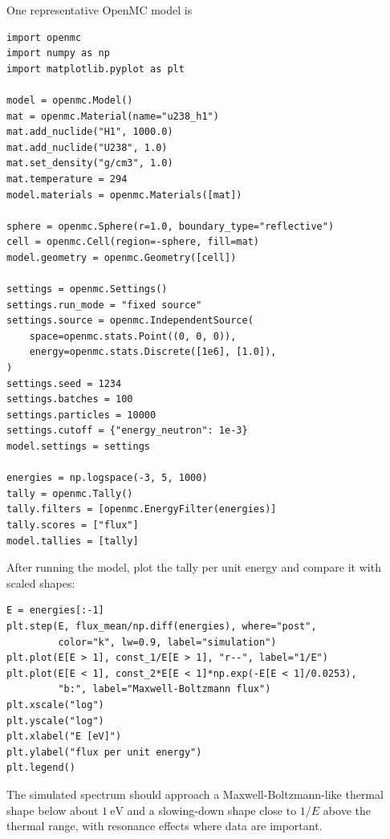 \begin{adaptedsolution}
One representative OpenMC model is
\begin{verbatim}
import openmc
import numpy as np
import matplotlib.pyplot as plt

model = openmc.Model()
mat = openmc.Material(name="u238_h1")
mat.add_nuclide("H1", 1000.0)
mat.add_nuclide("U238", 1.0)
mat.set_density("g/cm3", 1.0)
mat.temperature = 294
model.materials = openmc.Materials([mat])

sphere = openmc.Sphere(r=1.0, boundary_type="reflective")
cell = openmc.Cell(region=-sphere, fill=mat)
model.geometry = openmc.Geometry([cell])

settings = openmc.Settings()
settings.run_mode = "fixed source"
settings.source = openmc.IndependentSource(
    space=openmc.stats.Point((0, 0, 0)),
    energy=openmc.stats.Discrete([1e6], [1.0]),
)
settings.seed = 1234
settings.batches = 100
settings.particles = 10000
settings.cutoff = {"energy_neutron": 1e-3}
model.settings = settings

energies = np.logspace(-3, 5, 1000)
tally = openmc.Tally()
tally.filters = [openmc.EnergyFilter(energies)]
tally.scores = ["flux"]
model.tallies = [tally]
\end{verbatim}
After running the model, plot the tally per unit energy and compare it with
scaled shapes:
\begin{verbatim}
E = energies[:-1]
plt.step(E, flux_mean/np.diff(energies), where="post",
         color="k", lw=0.9, label="simulation")
plt.plot(E[E > 1], const_1/E[E > 1], "r--", label="1/E")
plt.plot(E[E < 1], const_2*E[E < 1]*np.exp(-E[E < 1]/0.0253),
         "b:", label="Maxwell-Boltzmann flux")
plt.xscale("log")
plt.yscale("log")
plt.xlabel("E [eV]")
plt.ylabel("flux per unit energy")
plt.legend()
\end{verbatim}
The simulated spectrum should approach a Maxwell-Boltzmann-like thermal shape
below about $1~\mathrm{eV}$ and a slowing-down shape close to $1/E$ above the
thermal range, with resonance effects where  data are important.
\end{adaptedsolution}

\clearpage
